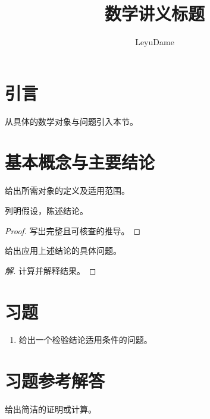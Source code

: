 \documentclass[11pt,a4paper,fontset=fandol]{ctexart}
\title{数学讲义标题}
\author{LeyuDame}\date{}
\numberwithin{equation}{section}
\begin{document}
\maketitle
\section*{引言}
从具体的数学对象与问题引入本节。
\section{基本概念与主要结论}
\begin{definition}
给出所需对象的定义及适用范围。
\end{definition}
\begin{theorem}
列明假设，陈述结论。
\end{theorem}
\begin{proof}
写出完整且可核查的推导。
\end{proof}
\begin{example}
给出应用上述结论的具体问题。
\end{example}
\begin{proof}[解]
计算并解释结果。
\end{proof}
\section{习题}
\begin{enumerate}
\item 给出一个检验结论适用条件的问题。
\end{enumerate}
\appendix
\section{习题参考解答}
给出简洁的证明或计算。
\end{document}

